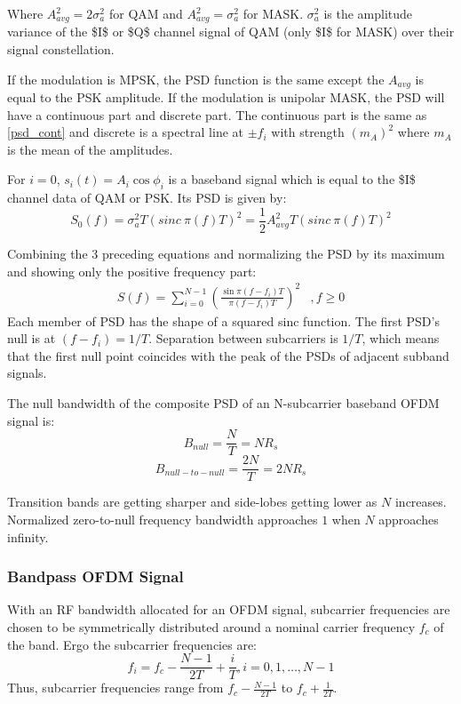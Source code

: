 Where $A_{avg}^2 = 2\sigma_a^2$ for \gls{QAM} and $A_{avg}^2 = \sigma_a^2$ for \gls{MASK}. $\sigma_a^2$ is the amplitude variance of the \gls{$I$} or \gls{$Q$} channel signal of \gls{QAM} (only \gls{$I$} for MASK) over their signal constellation.

If the modulation is \gls{MPSK}, the \gls{PSD} function is the same except the $A_{avg}$ is equal to the \gls{PSK} amplitude. If the modulation is unipolar \gls{MASK}, the \gls{PSD} will have a continuous part and discrete part. The continuous part is the same as \eqref{psd_cont} and discrete is a spectral line at $\pm f_i$ with strength $\left( m_A\right)^2$ where $m_A$ is the mean of the amplitudes.

For $i=0$, $s_i(t) = A_i\cos\phi_i$ is a baseband signal which is equal to the \gls{$I$} channel data of \gls{QAM} or \gls{PSK}. Its \gls{PSD} is given by:
$$S_0(f) = \sigma_a^2T\left( sinc\ \pi (f)T\right)^2 = \frac{1}{2}A_{avg}^2T\left( sinc\ \pi (f)T\right)^2$$

Combining the 3 preceding equations and normalizing the \gls{PSD} by its maximum and showing only the positive frequency part:
\begin{align}
	\label{psd_gen}
	S(f) = \sum_{i=0}^{N-1}\left( \frac{\sin\pi(f-f_i)T}{\pi(f-f_i)T}\right)^2 &, f\geq 0
\end{align}
Each member of \gls{PSD} has the shape of a squared sinc function. The first \gls{PSD}'s null is at $(f-f_i)=1/T$. Separation between \gls{subcarrier}s is $1/T$, which means that the first null point coincides with the peak of the \gls{PSD}s of adjacent \gls{subband} signals.

The null bandwidth of the composite PSD of an N-subcarrier baseband OFDM signal is:
$$B_{null} = \frac{N}{T} = NR_s$$
$$B_{null-to-null}=\frac{2N}{T} = 2NR_s$$

Transition bands are getting sharper and side-lobes getting lower as $N$ increases. Normalized zero-to-null frequency bandwidth approaches $1$ when $N$ approaches infinity.

\subsubsection{Bandpass \gls{OFDM} Signal}
With an \gls{RF} bandwidth allocated for an \gls{OFDM} signal, \gls{subcarrier} frequencies are chosen to be symmetrically distributed around a nominal carrier frequency $f_c$ of the band. Ergo the \gls{subcarrier} frequencies are:
$$f_i = f_c - \frac{N-1}{2T}+\frac{i}{T}, i=0,1,\ldots,N-1$$
Thus, \gls{subcarrier} frequencies range from $f_c - \frac{N-1}{2T}$ to $f_c + \frac{1}{2T}$.

